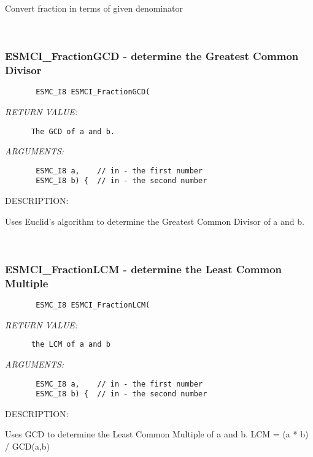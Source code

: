        Convert fraction in terms of given denominator
   
 
\mbox{}\hrulefill\ 
 
\subsubsection [ESMCI\_FractionGCD] {ESMCI\_FractionGCD - determine the Greatest Common Divisor}


  
\begin{verbatim}       ESMC_I8 ESMCI_FractionGCD(\end{verbatim}{\em RETURN VALUE:}
\begin{verbatim}      The GCD of a and b.\end{verbatim}{\em ARGUMENTS:}
\begin{verbatim}       ESMC_I8 a,    // in - the first number 
       ESMC_I8 b) {  // in - the second number\end{verbatim}
{\sf DESCRIPTION:\\ }


       Uses Euclid's algorithm to determine the Greatest Common Divisor of 
       a and b.
   
 
\mbox{}\hrulefill\ 
 
\subsubsection [ESMCI\_FractionLCM] {ESMCI\_FractionLCM - determine the Least Common Multiple}


  
\begin{verbatim}       ESMC_I8 ESMCI_FractionLCM(\end{verbatim}{\em RETURN VALUE:}
\begin{verbatim}      the LCM of a and b\end{verbatim}{\em ARGUMENTS:}
\begin{verbatim}       ESMC_I8 a,    // in - the first number 
       ESMC_I8 b) {  // in - the second number\end{verbatim}
{\sf DESCRIPTION:\\ }


        Uses GCD to determine the Least Common Multiple of a and b.
        LCM = (a * b) / GCD(a,b)
   
